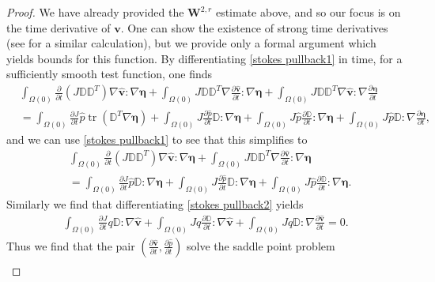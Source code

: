 \documentclass[a4paper]{amsart}
\numberwithin{equation}{section}
\newcommand{\ddt}[1]{\frac{\partial #1}{\partial t}}
\newcommand{\grad}{\nabla}
\theoremstyle{plain}
\newcommand{\mbf}[1]{\mathbf{#1}}
\newcommand{\mbb}[1]{\mathbb{#1}}
\newcommand{\tr}[1]{\operatorname{tr}\left(#1\right)}
\begin{document}
\begin{proof}
    We have already provided the $\mbf{W}^{2,r}$ estimate above, and so our focus is on the time derivative of $\mbf{v}$.
    One can show the existence of strong time derivatives (see \cite[Appendix A]{elliott2024navier} for a similar calculation), but we provide only a formal argument which yields bounds for this function.
    By differentiating \eqref{stokes pullback1} in time, for a sufficiently smooth test function, one finds
    \begin{align*}
        &\int_{\Omega(0)} \ddt{}(J \mbb{D} \mbb{D}^T) \grad \widehat{\mbf{v}}: \grad \boldsymbol{\eta} + \int_{\Omega(0)} J \mbb{D} \mbb{D}^T \grad \ddt{\widehat{\mbf{v}}}:\grad \boldsymbol{\eta} + \int_{\Omega(0)} J \mbb{D} \mbb{D}^T \grad\widehat{\mbf{v}}:\grad\ddt{\boldsymbol{\eta}}\\
        &= \int_{\Omega(0)} \ddt{J} \widehat{p} \tr{\mbb{D}^T \grad \boldsymbol{\eta}} + \int_{\Omega(0)} J \ddt{\widehat{p}} \mbb{D} :\grad \boldsymbol{\eta} + \int_{\Omega(0)} J \widehat{p} \ddt{\mbb{D}}:\grad \boldsymbol{\eta}+ \int_{\Omega(0)} J \widehat{p} \mbb{D}: \grad \ddt{\boldsymbol{\eta}},
    \end{align*}
    and we can use \eqref{stokes pullback1} to see that this simplifies to
    \begin{equation}
        \begin{aligned}
        &\int_{\Omega(0)} \ddt{}(J \mbb{D} \mbb{D}^T) \grad\widehat{\mbf{v}}:\grad \boldsymbol{\eta} + \int_{\Omega(0)} J \mbb{D} \mbb{D}^T \grad\ddt{\widehat{\mbf{v}}}: \grad \boldsymbol{\eta}\\
        &= \int_{\Omega(0)} \ddt{J} \widehat{p} \mbb{D}: \grad \boldsymbol{\eta} + \int_{\Omega(0)} J \ddt{\widehat{p}} \mbb{D}: \grad \boldsymbol{\eta} + \int_{\Omega(0)} J \widehat{p} \ddt{\mbb{D}} : \grad \boldsymbol{\eta}.
        \end{aligned}
        \label{stokes pullback3}
    \end{equation}
    Similarly we find that differentiating \eqref{stokes pullback2} yields
    \begin{align}
        \int_{\Omega(0)} \ddt{J} q \mbb{D}: \grad \widehat{\mbf{v}} + \int_{\Omega(0)} J q \ddt{\mbb{D}}: \grad \widehat{\mbf{v}} + \int_{\Omega(0)} J q \mbb{D}:\grad \ddt{\widehat{\mbf{v}}} = 0. \label{stokes pullback4}
    \end{align}
Thus we find that the pair $\left( \ddt{\widehat{\mbf{v}}}, \ddt{\widehat{p}} \right)$ solve the saddle point problem
\begin{gather}

\end{gather}
\end{proof}
\end{document}
